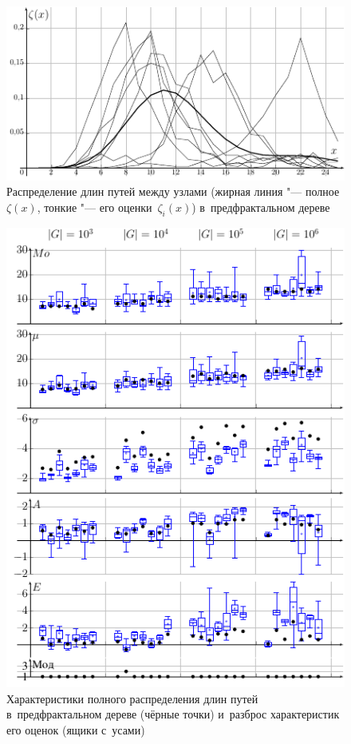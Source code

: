 \documentclass[10pt, a5paper]{article}
\begin{document}
\begin{figure}[!h]
  \centering
  \includegraphics[width=\linewidth]{2019_miet_kai_gav_rdp_fullpart_pfk_32}
  \caption{Распределение длин путей между узлами (жирная линия "--- полное $\zeta(x)$, тонкие "--- его оценки~$\zeta_i(x)$) в~предфрактальном дереве} 
\label{rdp_fullpart_pfk_32}
\end{figure}

\begin{figure}[p]
  \centering
  \includegraphics[width=\linewidth]{2019_miet_kai_gav_6_moments_pfk_32}
\caption{Характеристики полного распределения длин путей в~предфрактальном дереве (чёрные точки) и~разброс характеристик его оценок (ящики с~усами)}
\label{6_moments_pfk_32}
\end{figure}%
\end{document}
